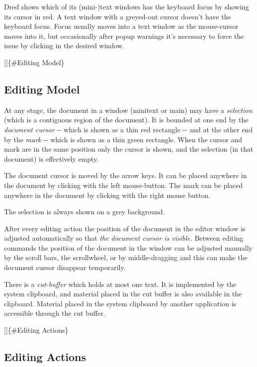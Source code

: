 \documentclass[
]{article}
\begin{document}
Dred shows which of its (mini-)text windows has the keyboard focus by
showing its cursor in red. A text window with a greyed-out cursor
doesn't have the keyboard focus. Focus usually moves into a text window
as the mouse-cursor moves into it, but occasionally after popup warnings
it's necessary to force the issue by clicking in the desired window.

{[}{]}\{\#Editing Model\}

\hypertarget{editing-model}{%
\subsection{Editing Model}\label{editing-model}}

At any stage, the document in a window (minitext or main) may have a
\emph{selection} (which is a contiguous region of the document). It is
bounded at one end by the \emph{document cursor} -\/- which is shown as
a thin red rectangle -\/- and at the other end by the \emph{mark} -\/-
which is shown as a thin green rectangle. When the cursor and mark are
in the same position only the cursor is shown, and the selection (in
that document) is effectively empty.

The document cursor is moved by the arrow keys. It can be placed
anywhere in the document by clicking with the left mouse-button. The
mark can be placed anywhere in the document by clicking with the right
mouse button.

The selection is always shown on a grey background.

After every editing action the position of the document in the editor
window is adjusted automatically so that \emph{the document cursor is
visible.} Between editing commands the position of the document in the
window can be adjusted manually by the scroll bars, the scrollwheel, or
by middle-dragging and this can make the document cursor disappear
temporarily.

There is a \emph{cut-buffer} which holds at most one text. It is
implemented by the system clipboard, and material placed in the cut
buffer is also available in the clipboard. Material placed in the system
clipboard by another application is accessible through the cut buffer.

{[}{]}\{\#Editing Actions\}

\hypertarget{editing-actions}{%
\subsection{Editing Actions}\label{editing-actions}}
\end{document}
